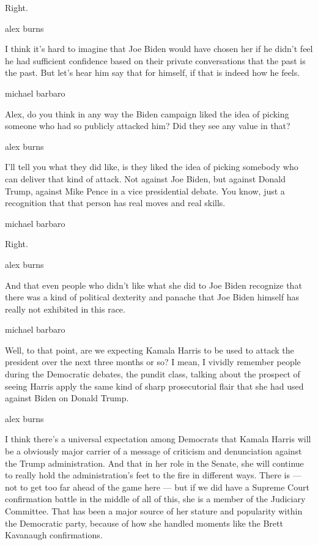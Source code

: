 Right.

alex burns

I think it's hard to imagine that Joe Biden would have chosen her if he
didn't feel he had sufficient confidence based on their private
conversations that the past is the past. But let's hear him say that for
himself, if that is indeed how he feels.

michael barbaro

Alex, do you think in any way the Biden campaign liked the idea of
picking someone who had so publicly attacked him? Did they see any value
in that?

alex burns

I'll tell you what they did like, is they liked the idea of picking
somebody who can deliver that kind of attack. Not against Joe Biden, but
against Donald Trump, against Mike Pence in a vice presidential debate.
You know, just a recognition that that person has real moves and real
skills.

michael barbaro

Right.

alex burns

And that even people who didn't like what she did to Joe Biden recognize
that there was a kind of political dexterity and panache that Joe Biden
himself has really not exhibited in this race.

michael barbaro

Well, to that point, are we expecting Kamala Harris to be used to attack
the president over the next three months or so? I mean, I vividly
remember people during the Democratic debates, the pundit class, talking
about the prospect of seeing Harris apply the same kind of sharp
prosecutorial flair that she had used against Biden on Donald Trump.

alex burns

I think there's a universal expectation among Democrats that Kamala
Harris will be a obviously major carrier of a message of criticism and
denunciation against the Trump administration. And that in her role in
the Senate, she will continue to really hold the administration's feet
to the fire in different ways. There is --- not to get too far ahead of
the game here --- but if we did have a Supreme Court confirmation battle
in the middle of all of this, she is a member of the Judiciary
Committee. That has been a major source of her stature and popularity
within the Democratic party, because of how she handled moments like the
Brett Kavanaugh confirmations.

